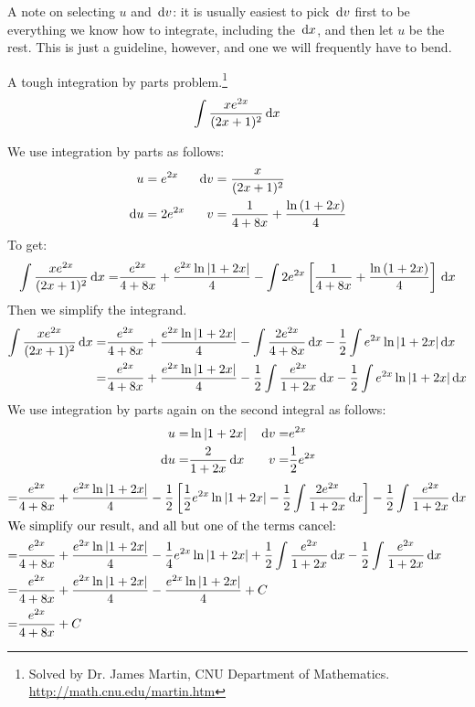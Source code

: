 A note on selecting $u$ and $\,\mathrm{d} v$: it is usually easiest to pick $\,\mathrm{d} v$ first to be everything we know how to integrate, including the $\,\mathrm{d} x$, and then let $u$ be the rest.
This is just a guideline, however, and one we will frequently have to bend.
\begin{ex} A tough integration by parts problem.\footnote{Solved by Dr. James Martin, CNU Department of Mathematics. \url{http://math.cnu.edu/martin.htm}}
	\[ \int \frac{xe^{2x}}{(2x+1)^2}\,\mathrm{d} x \]
  \begin{sol}
      We use integration by parts as follows:
      \begin{align*}
        u&=e^{2x} & \,\mathrm{d} v&=\frac{x}{(2x+1)^2} \\
        \,\mathrm{d} u &= 2e^{2x} & v &=\frac{1}{4+8x}+\frac{\ln{(1+2x)}}{4}
      \end{align*}
      To get:
      \begin{align*}
        \int \frac{xe^{2x}}{(2x+1)^2}\,\mathrm{d} x
        =& \frac{e^{2x}}{4+8x}+\frac{e^{2x}\ln{|1+2x|}}{4}-\int 2e^{2x}\left[\frac{1}{4+8x}+\frac{\ln{(1+2x)}}{4}\right]\,\mathrm{d} x \\
      \end{align*}
      Then we simplify the integrand.
      \begin{align*}
        \int \frac{xe^{2x}}{(2x+1)^2}\,\mathrm{d} x =& \frac{e^{2x}}{4+8x}+\frac{e^{2x}\ln{|1+2x|}}{4}-\int \frac{2e^{2x}}{4+8x}\,\mathrm{d} x-\frac{1}{2} \int e^{2x}\ln{|1+2x|}\,\mathrm{d} x \\
        =& \frac{e^{2x}}{4+8x}+\frac{e^{2x}\ln{|1+2x|}}{4}-\frac{1}{2}\int \frac{e^{2x}}{1+2x}\,\mathrm{d} x-\frac{1}{2} \int e^{2x}\ln{|1+2x|}\,\mathrm{d} x
      \end{align*}
      We use integration by parts again on the second integral as follows:
      \begin{align*}
        u=&\ln{|1+2x|} & \,\mathrm{d} v=&e^{2x} \\
        \,\mathrm{d} u=&\frac{2}{1+2x}\,\mathrm{d} x & v=& \frac{1}{2}e^{2x}
      \end{align*}
      \begin{align*}
        =& \frac{e^{2x}}{4+8x}+\frac{e^{2x}\ln{|1+2x|}}{4}
        -\frac{1}{2}\left[\frac{1}{2}e^{2x}\ln{|1+2x|}
          -\frac{1}{2} \int \frac{2e^{2x}}{1+2x} \,\mathrm{d} x\right]
          -\frac{1}{2}\int \frac{e^{2x}}{1+2x}\,\mathrm{d} x \\
          \intertext{We simplify our result, and all but one of the terms cancel:}
          =& \frac{e^{2x}}{4+8x}+\frac{e^{2x}\ln{|1+2x|}}{4}
          -\frac{1}{4}e^{2x}\ln{|1+2x|}
          + \frac{1}{2} \int \frac{e^{2x}}{1+2x} \,\mathrm{d} x
          -\frac{1}{2}\int \frac{e^{2x}}{1+2x}\,\mathrm{d} x \\
          =& \frac{e^{2x}}{4+8x}+\frac{e^{2x}\ln{|1+2x|}}{4}
          -\frac{e^{2x}\ln{|1+2x|}}{4}+C \\
          =& \frac{e^{2x}}{4+8x}+C
        \end{align*}
\end{sol}
\end{ex}
